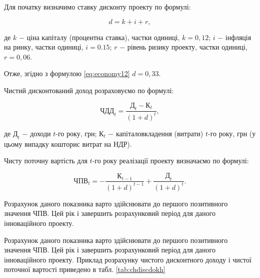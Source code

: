 Для початку визначимо ставку дисконту проекту по формулі:

\begin{equation}\label{eq:economy12}
	d = k + i + r,
\end{equation}

\noindent де $k$ $-$ ціна капіталу (процентна ставка), частки одиниці, $k = 0,12$;\newline
\hspace*{19pt}$i$ $-$ інфляція на ринку, частки одиниці, $i = 0.15$;\newline
\hspace*{19pt}$r$ $-$ рівень ризику проекту, частки одиниці, $r = 0,06$.

Отже, згідно з формулою \ref{eq:economy12} $d = 0,33$.

Чистий дисконтований доход розраховуємо по формулі:

\begin{equation}\label{eq:economy13}
	\text{ЧДД}_{t} = \frac{\text{Д}_{t} - \text{К}_{t}}{(1 + d)^{t}},
\end{equation}

\noindent де $\text{Д}_{t}$ $-$ доходи $t$-го року, грн;\newline
\hspace*{19pt}$\text{К}_{t}$ $-$ капіталовкладення (витрати) $t$-го року, грн (у цьому випадку\newline \hspace*{19pt}  кошторис витрат на НДР).

\vspace{1.5em}

Чисту поточну вартість для $t$-го року реалізації проекту визначаємо по формулі:

\begin{equation}\label{eq:economy14}
	\text{ЧПВ}_{t} = -\frac{\text{К}_{t-1}}{(1 + d)^{t-1}} + \frac{\text{Д}_{t}}{(1 + d)^{t}}.
\end{equation}	

\vspace{1.5em}

Розрахунок даного показника варто здійснювати до першого позитивного значення ЧПВ. Цей рік і завершить розрахунковий період для даного інноваційного проекту.

Розрахунок даного показника варто здійснювати до першого позитивного значення ЧПВ. Цей рік і завершить розрахунковий період для даного інноваційного проекту. Приклад розрахунку чистого дисконтного доходу і чистої поточної вартості приведено в табл. \ref{tab:chdiscdokh}

